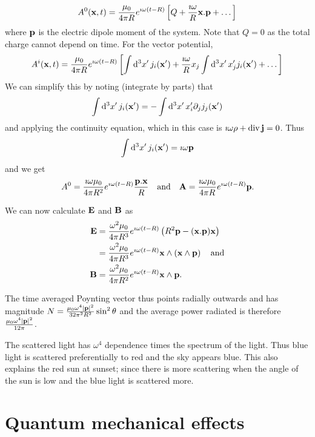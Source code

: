 \documentclass{notes}
\newcommand{\B}{\vect{B}}
\newcommand{\E}{\vect{E}}
\newcommand{\jc}{\vect{j}}
\DeclareMathOperator{\dive}{div}
\begin{document}
\[
A^0(\mathbf{x},t) = \frac{\mu_0}{4 \pi R} e^{\imath \omega \left(
t - R \right)} \left[Q + \frac{\imath \omega}{R} \mathbf{x}.\mathbf{p} + \dots
\right]
\]
where $\mathbf{p}$ is the electric dipole moment of the system.  Note that
$Q = 0$ as the total charge cannot depend on time.  For the vector
potential,
\[
A^i(\mathbf{x},t) = \frac{\mu_0}{4 \pi R} e^{\imath \omega \left(
t - R\right)} \left[
\int \mathrm{d}^3 x'\, j_i(\mathbf{x}') + \frac{\imath \omega}{R} x_j
\int \mathrm{d}^3 x'\, x_j' j_i(\mathbf{x}') + \dots
\right]
\]
We can simplify this by noting (integrate by parts)
that
\[
\int \mathrm{d}^3 x' \, j_i(\mathbf{x}') = - \int \mathrm{d}^3 x'\, x_i' \partial_j
j_j(\mathbf{x}')
\]
and applying the continuity equation, which in this case is $
\imath \omega \rho + \dive \jc = 0$.  Thus
\[
\int \mathrm{d}^3 x' \, j_i(\mathbf{x}') = \imath \omega \mathbf{p}
\]
and we get
\[
A^0 = \frac{\imath \omega \mu_0}{4 \pi R^2} e^{\imath \omega \left( t-R
\right)} \frac{\mathbf{p}.\mathbf{x}}{R} \quad \text{and} \quad
\mathbf{A} = \frac{\imath \omega \mu_0}{4 \pi R} e^{\imath \omega \left( t-R
\right)} \mathbf{p}.
\]

We can now calculate $\E$ and $\B$ as
\begin{align*}
\E &= \frac{\omega^2 \mu_0}{4 \pi R^3} e^{\imath \omega \left( t-R \right)}
\left(R^2 \vect{p} - (\vx . \vect{p}) \vx \right) \\
&= \frac{\omega^2 \mu_0}{4 \pi R^3} e^{\imath \omega \left( t-R \right)}
\vx \wedge \left( \vx \wedge \vect{p} \right) \quad \text{and}\\
\B &= \frac{\omega^2 \mu_0}{4 \pi R^2} e^{\imath \omega \left( t-R \right)}
\vx \wedge \vect{p}.
\end{align*}

The time averaged Poynting vector thus points radially outwards and has
magnitude $N = \frac{\mu_0 \omega^4 \left|\mathbf{p}\right|^2}{32 \pi^2 R^2}
\sin^2 \theta$ and the average power radiated is therefore
$\frac{\mu_0 \omega^4 \left|\mathbf{p}\right|^2}{12 \pi}$.

The scattered light has $\omega^4$ dependence times the spectrum of the
light.  Thus blue light is scattered preferentially to red and the sky
appears blue.  This also explains the red sun at sunset; since there is more
scattering when the angle of the sun is low and the blue light is scattered
more.

\chapter{Quantum mechanical effects}
\end{document}
